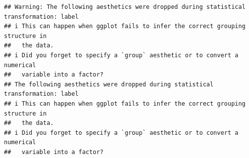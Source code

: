 \documentclass[
]{article}
\newenvironment{Shaded}{\begin{snugshade}}{\end{snugshade}}
\newcommand{\AttributeTok}[1]{\textcolor[rgb]{0.13,0.29,0.53}{#1}}
\newcommand{\ConstantTok}[1]{\textcolor[rgb]{0.56,0.35,0.01}{#1}}
\newcommand{\DecValTok}[1]{\textcolor[rgb]{0.00,0.00,0.81}{#1}}
\newcommand{\FunctionTok}[1]{\textcolor[rgb]{0.13,0.29,0.53}{\textbf{#1}}}
\newcommand{\NormalTok}[1]{#1}
\newcommand{\SpecialCharTok}[1]{\textcolor[rgb]{0.81,0.36,0.00}{\textbf{#1}}}
\newcommand{\StringTok}[1]{\textcolor[rgb]{0.31,0.60,0.02}{#1}}
\begin{document}
\begin{Shaded}
\end{Shaded}

\begin{verbatim}
## Warning: The following aesthetics were dropped during statistical transformation: label
## i This can happen when ggplot fails to infer the correct grouping structure in
##   the data.
## i Did you forget to specify a `group` aesthetic or to convert a numerical
##   variable into a factor?
## The following aesthetics were dropped during statistical transformation: label
## i This can happen when ggplot fails to infer the correct grouping structure in
##   the data.
## i Did you forget to specify a `group` aesthetic or to convert a numerical
##   variable into a factor?
\end{verbatim}
\end{document}
